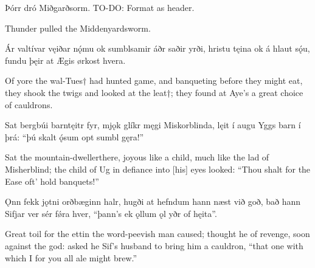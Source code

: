Þórr dró Miðgarðsorm. TO-DO: Format as header.

Thunder pulled the Middenyardsworm.\footnotemark[1]

Ár valtívar \hld vęiðar nǫ́mu
ok sumblsamir \hld áðr saðir yrði,
hristu tęina \hld ok á hlaut sǫ́u,
fundu þęir at Ægis \hld ørkost hvera.

Of yore the wal-Tues† had hunted game\footnotemark[1], and banqueting before they might eat\footnotemark[2], they shook the twigs and looked at the leat†\footnotemark[3]; they found at Aye’s a great choice of cauldrons.\footnotemark[4]

Sat bergbúi \hld barntęitr fyr,
mjǫk glíkr męgi \hld Miskorblinda,
lęit í augu \hld Yggs barn í þrá:
“þú skalt ǫ́sum \hld opt sumbl gęra!”

Sat the mountain-dweller\footnotemark[1] there, joyous like a child, much like the lad of Misherblind\footnotemark[2]; the child of Ug in defiance into [his] eyes looked: “Thou shalt for the Ease oft’ hold banquets!”\footnotemark[3]

Ǫnn fekk jǫtni \hld orðbæginn halr,
hugði at hefndum \hld hann næst við goð,
bað hann Sifjar ver \hld sér fǿra hver,
“þann’s ek ǫllum ǫl \hld yðr of hęita”.

Great toil for the ettin the word-peevish man caused; thought he of revenge, soon against the god: asked he Sif’s husband to bring him a cauldron, “that one with which I for you all ale might brew.”\footnotemark[1]

